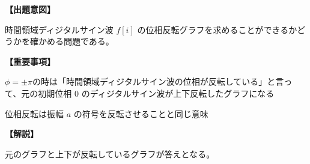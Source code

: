 \noindent \textbf{【出題意図】}

\noindent 時間領域ディジタルサイン波 $f[i]$ の位相反転グラフを求めることができるかどうかを確かめる問題である。

\vspace{1em}
\noindent \textbf{【重要事項】}

\bigskip
\noindent  $\phi = \pm\pi$の時は「時間領域ディジタルサイン波の位相が反転している」と言って、元の初期位相 $0$ のディジタルサイン波が上下反転したグラフになる

\bigskip
\noindent  位相反転は振幅 $a$ の符号を反転させることと同じ意味


\vspace{1em}
\noindent \textbf{【解説】}

\noindent 元のグラフと上下が反転しているグラフが答えとなる。
